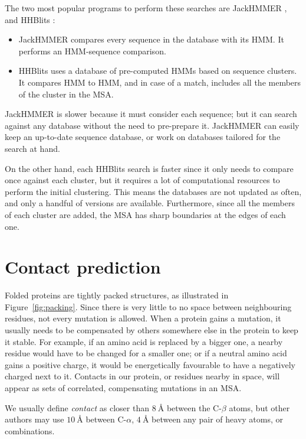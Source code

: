 The two most popular programs to perform these searches are JackHMMER \citep{jh}, and HHBlits \citep{hhblits}:

\begin{itemize}
\item JackHMMER compares every sequence in the database with its HMM.
It performs an HMM-sequence comparison.
\item HHBlits uses a database of pre-computed HMMs based on sequence clusters.
It compares HMM to HMM, and in case of a match, includes all the members of the cluster in the MSA.
\end{itemize}

JackHMMER is slower
because it must consider each sequence; but it can search against any database without the need to pre-prepare it.
JackHMMER can easily keep an up-to-date sequence database, or work on databases tailored for the search at hand.

On the other hand, each HHBlits search is faster since it only needs to compare once against each cluster, but it requires a lot of computational resources to perform the initial clustering.
This means the databases are not updated as often, and only a handful of versions are available.
Furthermore, since all the members of each cluster are added, the MSA has sharp boundaries at the edges of each one.


\section{Contact prediction}
Folded proteins are tightly packed structures, as illustrated in Figure~\ref{fig:packing}.
Since there is very little to no space between neighbouring residues, not every mutation is allowed.
When a protein gains a mutation, it usually needs to be compensated by others somewhere else in the protein to keep it stable.
For example, if an amino acid is replaced by a bigger one, a nearby residue would have to be changed for a smaller one; or if a neutral amino acid gains a positive charge, it would be energetically favourable to have a negatively charged next to it.
Contacts in our protein, or residues nearby in space, will appear as sets of correlated, compensating mutations in an MSA.

We usually define \emph{contact}  as closer than $\SI{8}{\angstrom}$ between the C-$\beta$ atoms,
but other authors may use $\SI{10}{\angstrom}$ between C-$\alpha$, $\SI{4}{\angstrom}$ between any pair of heavy atoms, or combinations.

